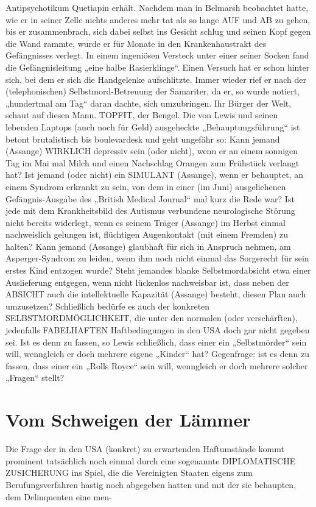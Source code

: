 \begin{multicols}{2}
Antipsychotikum Quetiapin erhält. Nachdem man in
Belmarsh beobachtet hatte, wie er in seiner Zelle nichts
anderes mehr tat als so lange AUF und AB zu gehen, bis
er zusammenbrach, sich dabei selbst ins Gesicht schlug
und seinen Kopf gegen die Wand rammte, wurde er für
Monate in den Krankenhaustrakt des Gefängnisses verlegt. In einem ingeniösen Versteck unter einer seiner
Socken fand die Gefängnisleitung „eine halbe Rasierklinge“. Einen Versuch hat er schon hinter sich, bei dem
er sich die Handgelenke aufschlitzte. Immer wieder rief
er nach der (telephonischen) Selbstmord-Betreuung der
Samariter, da er, so wurde notiert, „hundertmal am Tag“
daran dachte, sich umzubringen.
Ihr Bürger der Welt, schaut auf diesen Mann.
TOPFIT, der Bengel. Die von Lewis und seinen lebenden
Laptops (auch noch für Geld) ausgeheckte „Behauptungsführung“ ist betont brutalistisch bis boulevardesk
und geht ungefähr so:
Kann jemand (Assange) WIRKLICH depressiv sein (oder
nicht), wenn er an einem sonnigen Tag im Mai mal Milch
und einen Nachschlag Orangen zum Frühstück verlangt
hat? Ist jemand (oder nicht) ein SIMULANT (Assange),
wenn er behauptet, an einem Syndrom erkrankt zu
sein, von dem in einer (im Juni) ausgeliehenen Gefängnis-Ausgabe des „British Medical Journal“ mal kurz die
Rede war? Ist jede mit dem Krankheitsbild des Autismus verbundene neurologische Störung nicht bereits
widerlegt, wenn es seinem Träger (Assange) im Herbst
einmal nachweislich gelungen ist, flüchtigen Augenkontakt (mit einem Fremden) zu halten? Kann jemand
(Assange) glaubhaft für sich in Anspruch nehmen, am
Asperger-Syndrom zu leiden, wenn ihm noch nicht einmal das Sorgerecht für sein erstes Kind entzogen wurde?
Steht jemandes blanke Selbstmordabsicht etwa einer
Auslieferung entgegen, wenn nicht lückenlos nachweisbar ist, dass neben der ABSICHT auch die intellektuelle
Kapazität (Assange) besteht, diesen Plan auch umzusetzen? Schließlich bedürfe es auch der konkreten SELBSTMORDMÖGLICHKEIT, die unter den normalen (oder
verschärften), jedenfalls FABELHAFTEN Haftbedingungen in den USA doch gar nicht gegeben sei. Ist es denn
zu fassen, so Lewis schließlich, dass einer ein „Selbstmörder“ sein will, wenngleich er doch mehrere eigene
„Kinder“ hat? Gegenfrage: ist es denn zu fassen, dass einer ein „Rolls Royce“ sein will, wenngleich er doch mehrere solcher „Fragen“ stellt?


\chapter{Vom Schweigen der Lämmer}
Die Frage der in den USA (konkret) zu erwartenden Haftumstände kommt prominent tatsächlich noch einmal
durch eine sogenannte DIPLOMATISCHE ZUSICHERUNG ins Spiel, die die Vereinigten Staaten eigens zum
Berufungsverfahren hastig noch abgegeben hatten und
mit der sie behaupten, dem Delinquenten eine men-


\end{multicols}
